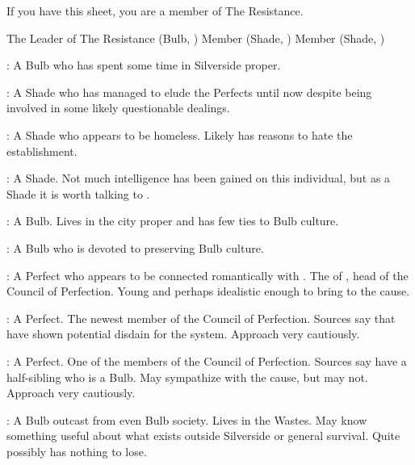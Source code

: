 \documentclass[blue]{Silversiders}
\begin{document}
\name{\bResistance{}}

If you have this sheet, you are a member of The Resistance.

\begin{members}
	\member{\cIngenuity{}} The Leader of The Resistance (Bulb, \cIngenuity{\Sex})
	\member{\cCaregiver{}} Member (Shade, \cCaregiver{\Sex})
	\member{\cLove{}} Member (Shade, \cLove{\Sex})
	
\end{members}

\begin{itemz}
	\item \cBeauty{}: A \cBeauty{\sex} Bulb who has spent some time in Silverside proper.
	\item \cTrickster{}: A \cTrickster{\sex} Shade who has managed to elude the Perfects until now despite being involved in some likely questionable dealings.
	\item \cWisdom{}: A \cWisdom{\sex} Shade who appears to be homeless. Likely has reasons to hate the establishment.
	\item \cTraitor{}: A \cTraitor{\sex} Shade. Not much intelligence has been gained on this individual, but as a Shade it is worth talking to \cTraitor{\them}.
	\item \cOracle{}: A \cOracle{\sex} Bulb. Lives in the city proper and has few ties to Bulb culture.
	\item \cHonor{}: A \cHonor{\sex} Bulb who is devoted to preserving Bulb culture.
	\item \cTruth{}: A \cTruth{\sex} Perfect who appears to be connected romantically with \cWisdom{}. The \cTruth{\offspring} of \cDeath{}, head of the Council of Perfection. Young and perhaps idealistic enough to bring to the cause.
	\item \cFamine{}: A \cFamine{\sex} Perfect. The newest member of the Council of Perfection. Sources say that \cFamine{\they} have shown potential disdain for the system. Approach very cautiously.
	\item \cPestilence{}: A \cPestilence{\sex} Perfect. One of the members of the Council of Perfection. Sources say \cPestilence{\they} have a half-sibling who is a Bulb. May sympathize with the cause, but may not. Approach very cautiously.
	\item \cOutcast{}: A \cOutcast{\sex} Bulb outcast from even Bulb society. Lives in the Wastes. May know something useful about what exists outside Silverside or general survival. Quite possibly has nothing to lose.				
\end{itemz}
\end{document}
